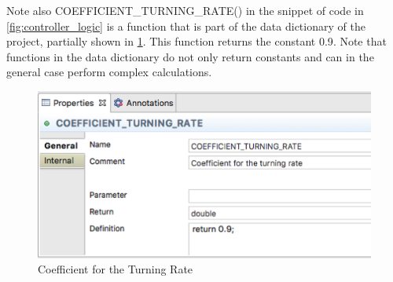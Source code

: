 Note also \textsf{COEFFICIENT\_TURNING\_RATE()}  in the snippet of code in
\fig\ref{fig:controller_logic} is a function that is part of the data dictionary
of the project, partially shown in \fig\ref{fig:coefficient_turning_rate}. This function
returns the constant \textsf{0.9}. Note that functions in the data dictionary
do not only return constants and can in the general case perform complex
calculations.

\begin{figure}[!h]
\centering
\includegraphics[width=.7\textwidth]{images/coefficient_turning_rate.png}
\caption{Coefficient for the Turning Rate} 
\label{fig:coefficient_turning_rate}
\end{figure}